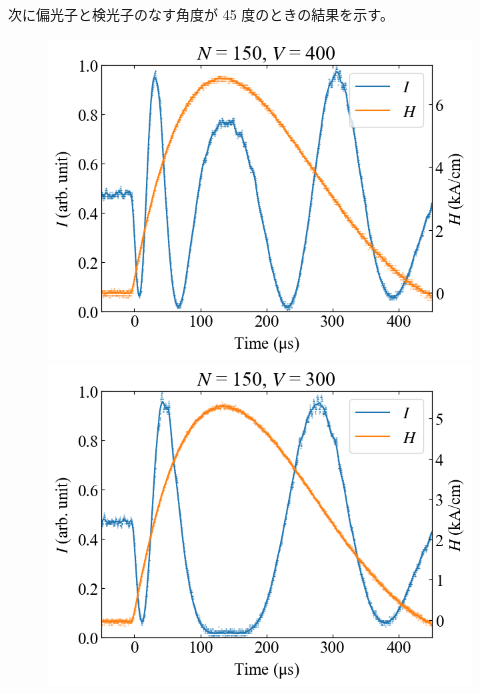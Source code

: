 \documentclass[9pt,dvipdfmx,a4paper]{jsarticle}
\begin{document}
次に偏光子と検光子のなす角度が 45 度のときの結果を示す。
\begin{figure}[H]
    \centering
    \begin{minipage}[t]{0.24\columnwidth}
        \centering
        \includegraphics[width = \columnwidth]{xt/17.png}
    \end{minipage}
    \hfill
    \begin{minipage}[t]{0.24\columnwidth}
        \centering
        \includegraphics[width = \columnwidth]{xt/18.png}
    \end{minipage}
    \hfill
    \begin{minipage}[t]{0.24\columnwidth}
        \centering

\end{minipage}
\end{figure}
\end{document}
